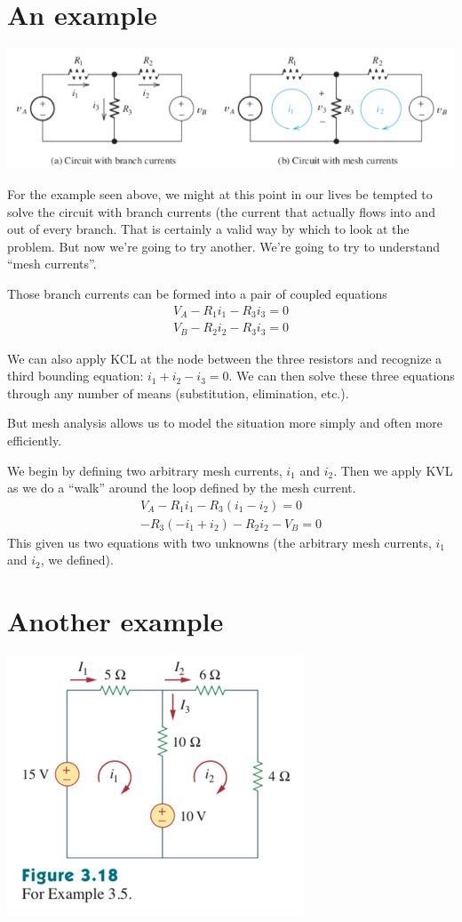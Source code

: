 \documentclass[11pt]{book}
\begin{document}
\section{An example}
\includegraphics[width=\textwidth]{figures/05.mesh2.png}

For the example seen above, we might at this point in our lives be tempted to solve the circuit with branch currents (the current that actually flows into and out of every branch. That is certainly a valid way by which to look at the problem. But now we're going to try another. We're going to try to understand ``mesh currents''.

Those branch currents can be formed into a pair of coupled equations
\begin{eqnarray}
	V_A - R_1 i_1 - R_3 i_3 = 0 \\
	V_B - R_2 i_2 - R_3 i_3 = 0 
\end{eqnarray}

We can also apply KCL at the node between the three resistors and recognize a third bounding equation: $i_1 + i_2 - i_3 = 0$. We can then solve these three equations through any number of means (substitution, elimination, etc.).

But mesh analysis allows us to model the situation more simply and often more efficiently.

We begin by defining two arbitrary mesh currents, $i_1$ and $i_2$. Then we apply KVL as we do a ``walk'' around the loop defined by the mesh current.
\begin{eqnarray}
	V_A - R_1i_1 - R_3(i_1 - i_2) = 0 \\
	-R_3(-i_1 +i_2) - R_2i_2 - V_B = 0
\end{eqnarray}
This given us two equations with two unknowns (the arbitrary mesh currents, $i_1$ and $i_2$, we defined).

\section{Another example}
\begin{center}
	\includegraphics{figures/05.mesh3.png}
\end{center}
\end{document}
